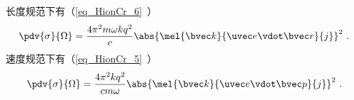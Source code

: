 长度规范下有（\autoref{eq_HionCr_6}~）
\begin{equation}
\pdv{\sigma}{\Omega} = \frac{4\pi^2 m\omega k q^2}{c} \abs{\mel{\bvec k}{\uvec e \vdot\bvec r}{j}}^2~.
\end{equation}
速度规范下有（\autoref{eq_HionCr_5}~）
\begin{equation}\label{eq_SIcros_8} %
\pdv{\sigma}{\Omega} = \frac{4\pi^2 k q^2}{c m \omega} \abs{\mel{\bvec k}{\uvec e \vdot \bvec p}{j}}^2~.
\end{equation}
